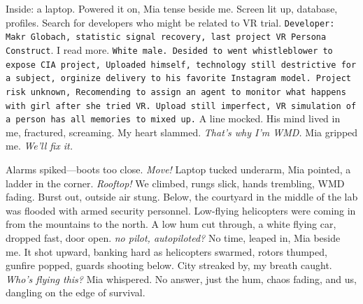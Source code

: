 \documentclass[12pt,oneside]{book}
\newcommand{\note}[1]{\texttt{#1}}
\begin{document}
Inside: a laptop. Powered it on, Mia tense beside me. Screen lit up, database, profiles. Search for developers who might be related to VR trial. \note{Developer: Makr Globach, statistic signal recovery, last project VR Persona Construct}. I read more. \note{White male. Desided to went whistleblower to expose CIA project, Uploaded himself, technology still destrictive for a subject, orginize delivery to his favorite Instagram model. Project risk unknown, Recomending to assign an agent to monitor what happens with girl after she tried VR. Upload still imperfect, VR simulation of a person has all memories to mixed up.} A line mocked. His mind lived in me, fractured, screaming. My heart slammed. \textit{That’s why I’m WMD.} Mia gripped me. \textit{We’ll fix it.}

Alarms spiked—boots too close. \textit{Move!} Laptop tucked underarm, Mia pointed, a ladder in the corner. \textit{Rooftop!} We climbed, rungs slick, hands trembling, WMD fading. Burst out, outside air stung. Below, the courtyard in the middle of the lab was flooded with armed security personnel. Low-flying helicopters were coming in from the mountains to the north. 
A low hum cut through, a white flying car, dropped fast, door open. \textit{no pilot, autopiloted?} No time, leaped in, Mia beside me. It shot upward, banking hard as helicopters swarmed, rotors thumped, gunfire popped, guards shooting below. City streaked by, my breath caught. \textit{Who’s flying this?} Mia whispered. No answer, just the hum, chaos fading, and us, dangling on the edge of survival.
\end{document}
